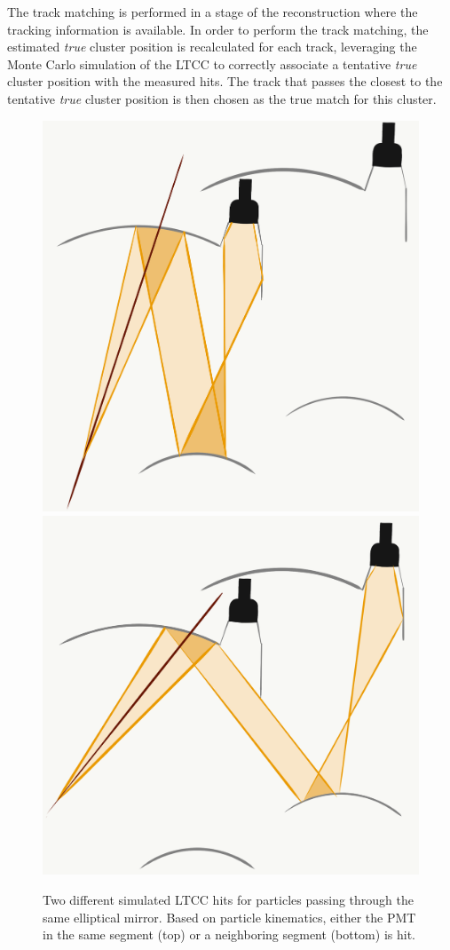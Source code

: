 The track matching is performed in a stage of the reconstruction where the tracking information is available. In
order to perform the track matching, the estimated \textit{true} cluster position is recalculated for each track,
leveraging the Monte Carlo simulation of the LTCC to correctly associate a tentative \textit{true} cluster position
with the measured hits. The track that passes the closest to the tentative \textit{true} cluster position is then
chosen as the true match for this cluster.

\begin{figure}
  \centering
  \includegraphics[width=0.99\columnwidth, keepaspectratio]{img/LTCC-event-1.png}
  \includegraphics[width=0.99\columnwidth, keepaspectratio]{img/LTCC-event-2.png}
  \caption{Two different simulated LTCC hits for particles passing through the same elliptical mirror. Based on
    particle kinematics, either the PMT in the same segment (top) or a neighboring segment (bottom) is hit.}
  \label{fig:trackmatching}
\end{figure}

